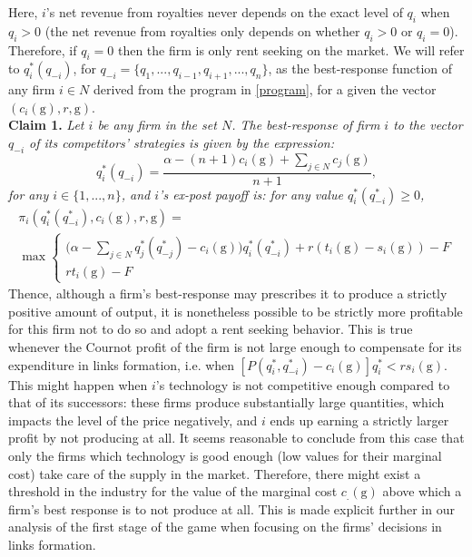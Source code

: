 \documentclass[11pt]{article}
\begin{document}
\indent Here, $i$'s net revenue from royalties never depends on the exact level of $q_i$ when $q_i>0$ (the net revenue from royalties only depends on whether $q_i>0$ or $q_i=0$). Therefore, if $q_i=0$ then the firm is only rent seeking on the market. We will refer to $q_i^*(q_{-i})$, for $q_{-i}=\{q_1,...,q_{i-1}, q_{i+1},...,q_n\}$, as the best-response function of any firm $i\in N$ derived from the program in \eqref{program}, for a given the vector $(c_i(\text{g}), r, \text{g})$. \\

\textbf{Claim 1.} \textit{Let $i$ be any firm in the set $N$. The best-response of firm $i$ to the vector $q_{-i}$ of its competitors' strategies is given by the expression: }
\begin{equation}
q_i^*(q_{-i}) = \dfrac{\alpha - (n+1)c_i(\text{g}) + \sum \limits_{ j\in N}c_j(\text{g})}{n+1}, \label{BR}
\end{equation}
\textit{for any $i \in \{1,...,n\} $, and $i$'s ex-post payoff is: for any value $q_i^*(q^*_{-i})\geq 0$,}
\begin{multline} 
\pi_i(q_i^*(q^*_{-i}), c_i(\text{g}), r, \text{g})=\\
\max 
\begin{cases}
 \Big(\alpha - \sum \limits_{j\in N} q_j^*(q^*_{-j})- c_i(\text{g})\Big)q_i^*(q^*_{-i}) +r(t_i(\text{g})-s_i(\text{g})) -F
 \\
 rt_i(\text{g}) -F
\end{cases}
\end{multline}
\indent Thence, although a firm's best-response may prescribes it to produce a strictly positive amount of output, it is nonetheless possible to be strictly more profitable for this firm not to do so and adopt a rent seeking behavior. This is true whenever the Cournot profit of the firm is not large enough to compensate for its expenditure in links formation, i.e. when $[P(q^*_i,q^*_{-i})-c_i(\text{g})]q^*_i< rs_i({\text{g}})$. This might happen when $i$'s technology is not competitive enough compared to that of its successors: these firms produce substantially large quantities, which impacts the level of the price negatively, and $i$ ends up earning a strictly larger profit by not producing at all. It seems reasonable to conclude from this case that only the firms which technology is good enough (low values for their marginal cost) take care of the supply in the market. Therefore, there might exist a threshold in the industry for the value of the marginal cost $c_.(\text{g})$ above which a firm's best response is to not produce at all. This is made explicit further in our analysis of the first stage of the game when focusing on the firms' decisions in links formation.  \\
\end{document}
